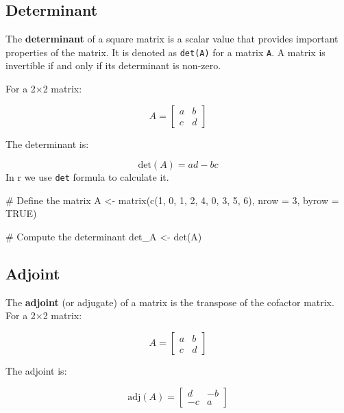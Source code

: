 \documentclass[
  letterpaper,
  DIV=11,
  numbers=noendperiod]{scrartcl}
\newenvironment{Shaded}{\begin{snugshade}}{\end{snugshade}}
\newcommand{\AttributeTok}[1]{\textcolor[rgb]{0.40,0.45,0.13}{#1}}
\newcommand{\CommentTok}[1]{\textcolor[rgb]{0.37,0.37,0.37}{#1}}
\newcommand{\ConstantTok}[1]{\textcolor[rgb]{0.56,0.35,0.01}{#1}}
\newcommand{\DecValTok}[1]{\textcolor[rgb]{0.68,0.00,0.00}{#1}}
\newcommand{\FunctionTok}[1]{\textcolor[rgb]{0.28,0.35,0.67}{#1}}
\newcommand{\NormalTok}[1]{\textcolor[rgb]{0.00,0.23,0.31}{#1}}
\newcommand{\OtherTok}[1]{\textcolor[rgb]{0.00,0.23,0.31}{#1}}
\begin{document}
\subsection{Determinant}\label{determinant}

The \textbf{determinant} of a square matrix is a scalar value that
provides important properties of the matrix. It is denoted as
\texttt{det(A)} for a matrix \texttt{A}. A matrix is invertible if and
only if its determinant is non-zero.

For a 2×2 matrix:

\[
A = \begin{bmatrix}
a & b \\
c & d
\end{bmatrix}
\]

The determinant is:

\[
\text{det}(A) = ad - bc
\] In r we use \texttt{det} formula to calculate it.

\begin{Shaded}
\begin{Highlighting}[]
\CommentTok{\# Define the matrix}
\NormalTok{A }\OtherTok{\textless{}{-}} \FunctionTok{matrix}\NormalTok{(}\FunctionTok{c}\NormalTok{(}\DecValTok{1}\NormalTok{, }\DecValTok{0}\NormalTok{, }\DecValTok{1}\NormalTok{, }\DecValTok{2}\NormalTok{, }\DecValTok{4}\NormalTok{, }\DecValTok{0}\NormalTok{, }\DecValTok{3}\NormalTok{, }\DecValTok{5}\NormalTok{, }\DecValTok{6}\NormalTok{), }\AttributeTok{nrow =} \DecValTok{3}\NormalTok{, }\AttributeTok{byrow =} \ConstantTok{TRUE}\NormalTok{)}

\CommentTok{\# Compute the determinant}
\NormalTok{det\_A }\OtherTok{\textless{}{-}} \FunctionTok{det}\NormalTok{(A)}
\end{Highlighting}
\end{Shaded}

\subsection{Adjoint}\label{adjoint}

The \textbf{adjoint} (or adjugate) of a matrix is the transpose of the
cofactor matrix. For a 2×2 matrix:

\[
A = \begin{bmatrix}
a & b \\
c & d
\end{bmatrix}
\]

The adjoint is:

\[
\text{adj}(A) = \begin{bmatrix}
d & -b \\
-c & a
\end{bmatrix}
\]
\end{document}
